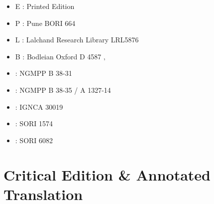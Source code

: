 \begin{itemize}
\item E : Printed Edition
\item P : Pune BORI 664
\item L : Lalchand Research Library LRL5876
\item B : Bodleian Oxford D 4587
‚\item \None : NGMPP B 38-31
\item \Ntwo : NGMPP B 38-35 / A 1327-14
\item \Done : IGNCA 30019
\item \Uone : SORI 1574
\item \Utwo: SORI 6082
\end{itemize}

\chapter{Critical Edition \& Annotated Translation}
\cleardoublepage
